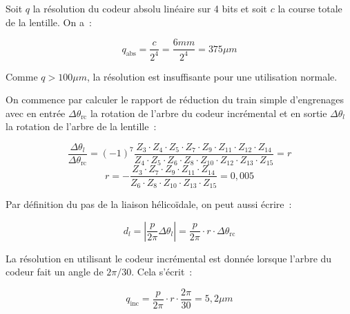 
\begin{texteCache}
Soit \(q\) la résolution du codeur absolu linéaire sur 4 bits et soit \(c\) la course totale de la lentille. On a~:

\[q_{\text{abs}} = \frac{c}{2^{4}}= \frac{6mm}{2^{4}} = 375\mu m\]

Comme \(q > 100\mu m\), la résolution est insuffisante pour une
utilisation normale.

\end{texteCache}



\begin{texteCache}

On commence par calculer le rapport de réduction du train simple
  d'engrenages avec en entrée \(\Delta\theta_{\text{rc}}\) la rotation
  de l'arbre du codeur incrémental et en sortie \(\Delta\theta_{l}\) la
  rotation de l'arbre de la lentille~:

\[{\frac{\Delta\theta_{l}}{\Delta\theta_{\text{rc}}} = \left( - 1 \right)^{7}\frac{Z_{3} \cdot Z_{4} \cdot Z_{5} \cdot Z_{7} \cdot Z_{9} \cdot Z_{11} \cdot Z_{12} \cdot Z_{14}}{Z_{4} \cdot Z_{5} \cdot Z_{6} \cdot Z_{8} \cdot Z_{10} \cdot Z_{12} \cdot Z_{13} \cdot Z_{15}} = r}\]\[{r = - \frac{Z_{3} \cdot Z_{7} \cdot Z_{9} \cdot Z_{11} \cdot Z_{14}}{Z_{6} \cdot Z_{8} \cdot Z_{10} \cdot Z_{13} \cdot Z_{15}} = 0,005}\]

Par définition du pas de la liaison hélicoïdale, on peut aussi écrire~:

\[d_{l} = \left| \frac{p}{2\pi}\Delta\theta_{l} \right| = \frac{p}{2\pi} \cdot r \cdot \Delta\theta_{\text{rc}}\]

La résolution en utilisant le codeur incrémental est donnée lorsque
l'arbre du codeur fait un angle de \(2\pi/30\). Cela s'écrit~:

\[q_{\text{inc}} = \frac{p}{2\pi} \cdot r \cdot \frac{2\pi}{30} = 5,2\mu m\]

\end{texteCache}





